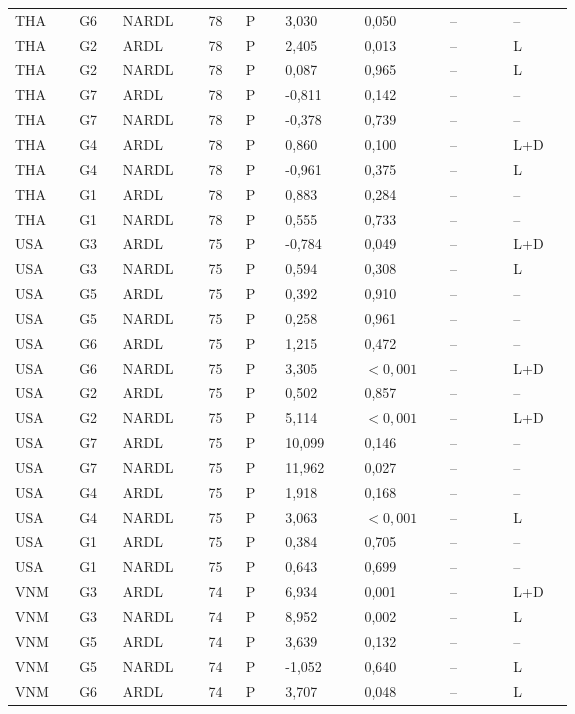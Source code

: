 {\begin{longtable}{p{0.075\linewidth}p{0.05\linewidth}p{0.09\linewidth}p{0.04\linewidth}p{0.05\linewidth}p{0.1\linewidth}p{0.085\linewidth}p{0.085\linewidth}p{0.075\linewidth}}
THA & G6 & NARDL & 78 & P & 3,030 & 0,050 & -- & --\\
THA & G2 & ARDL & 78 & P & 2,405 & 0,013 & -- & L\\
THA & G2 & NARDL & 78 & P & 0,087 & 0,965 & -- & L\\
THA & G7 & ARDL & 78 & P & -0,811 & 0,142 & -- & --\\
THA & G7 & NARDL & 78 & P & -0,378 & 0,739 & -- & --\\
THA & G4 & ARDL & 78 & P & 0,860 & 0,100 & -- & L+D\\
THA & G4 & NARDL & 78 & P & -0,961 & 0,375 & -- & L\\
THA & G1 & ARDL & 78 & P & 0,883 & 0,284 & -- & --\\
THA & G1 & NARDL & 78 & P & 0,555 & 0,733 & -- & --\\
USA & G3 & ARDL & 75 & P & -0,784 & 0,049 & -- & L+D\\
USA & G3 & NARDL & 75 & P & 0,594 & 0,308 & -- & L\\
USA & G5 & ARDL & 75 & P & 0,392 & 0,910 & -- & --\\
USA & G5 & NARDL & 75 & P & 0,258 & 0,961 & -- & --\\
USA & G6 & ARDL & 75 & P & 1,215 & 0,472 & -- & --\\
USA & G6 & NARDL & 75 & P & 3,305 & \(<0{,}001\) & -- & L+D\\
USA & G2 & ARDL & 75 & P & 0,502 & 0,857 & -- & --\\
USA & G2 & NARDL & 75 & P & 5,114 & \(<0{,}001\) & -- & L+D\\
USA & G7 & ARDL & 75 & P & 10,099 & 0,146 & -- & --\\
USA & G7 & NARDL & 75 & P & 11,962 & 0,027 & -- & --\\
USA & G4 & ARDL & 75 & P & 1,918 & 0,168 & -- & --\\
USA & G4 & NARDL & 75 & P & 3,063 & \(<0{,}001\) & -- & L\\
USA & G1 & ARDL & 75 & P & 0,384 & 0,705 & -- & --\\
USA & G1 & NARDL & 75 & P & 0,643 & 0,699 & -- & --\\
VNM & G3 & ARDL & 74 & P & 6,934 & 0,001 & -- & L+D\\
VNM & G3 & NARDL & 74 & P & 8,952 & 0,002 & -- & L\\
VNM & G5 & ARDL & 74 & P & 3,639 & 0,132 & -- & --\\
VNM & G5 & NARDL & 74 & P & -1,052 & 0,640 & -- & L\\
VNM & G6 & ARDL & 74 & P & 3,707 & 0,048 & -- & L\\

\end{longtable}}

